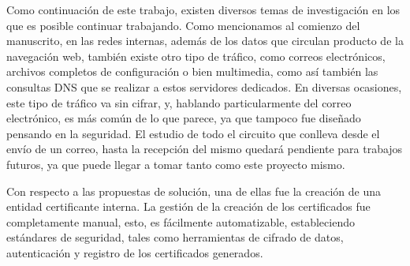 Como continuación de este trabajo, existen diversos temas de investigación en los que es posible 
continuar trabajando. Como mencionamos al comienzo del manuscrito, en las redes internas, además de
los datos que circulan producto de la navegación web, también existe
otro tipo de tráfico, como correos electrónicos, archivos completos de 
configuración o bien multimedia, como así también las consultas DNS que 
se realizar a estos servidores dedicados. En diversas ocasiones, este 
tipo de tráfico va sin cifrar, y, hablando particularmente del correo electrónico,
es más común de lo que parece, ya que tampoco fue diseñado pensando en la 
seguridad. El estudio de todo el circuito que conlleva desde el envío de 
un correo, hasta la recepción del mismo quedará pendiente para trabajos futuros, 
ya que puede llegar a tomar tanto como este proyecto mismo.

Con respecto a las propuestas de solución, una de ellas fue la creación de una entidad 
certificante
interna. La gestión de la creación de los certificados fue completamente 
manual, esto, es fácilmente automatizable, estableciendo estándares 
de seguridad, tales como herramientas de cifrado de datos, autenticación y registro de los 
certificados generados.

